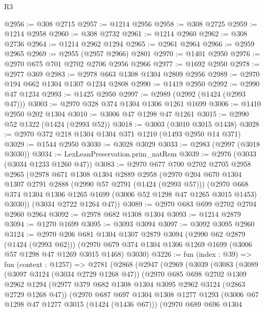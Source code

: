 \begin{lexlean}{R3}
\begin{coremodule}
@2956 := @308 @2715
@2957 := @1214 @2956
@2958 := @308 @2725
@2959 := @1214 @2958
@2960 := @308 @2732
@2961 := @1214 @2960
@2962 := @308 @2736
@2964 := @1214 @2962 @1294
@2965 := @2961 @2964
@2966 := @2959 @2965
@2969 := @2955 (@2957 @2966) @2801
@2970 := @1401 @2950
@2976 := @2970 @675 @701 @2702 @2706 @2956 @2966
@2977 := @1692 @2950
@2978 := @2977 @369
@2983 := @2978 @663 @1308 @1304 @2809 @2956
@2989 := @2970 @194 @662 @1304 @1307 @1234 @2808
@2990 := @1419 @2950
@2992 := @2990 @47 @1234
@2993 := @1425 @2950
@2997 := @2989 (@2992 (@1424 (@2993 @47)))
@3003 := @2970 @328 @374 @1304 @1306 @1261 @1699
@3006 := @1410 @2950 @202 @1304
@3010 := @3006 @47 @1298 @47 @1261
@3015 := @2990 @52 @1322 (@1424 (@2993 @52))
@3018 := @3003 (@3010 @3015 @1438)
@3028 := @2970 @372 @218 @1304 @1304 @371 @1210 (@1493 @2950 @14 @371)
@3029 := @1544 @2950
@3030 := @3028 @3029
@3033 := @2983 (@2997 (@3018 @3030))
@3034 := LexLeanPreservation.prim_natRem
@3039 := @2976 (@3033 (@3034 @1233 @1260 @47))
@3083 := @2970
    @677
    @700
    @2702
    @2705
    @2958
    @2965
    (@2978
      @671
      @1308
      @1304
      @2889
      @2958
      (@2970
        @204
        @670
        @1304
        @1307
        @2791
        @2888
        (@2990 @57 @2791 (@1424 (@2993 @57)))
        (@2970 @668 @374 @1304 @1306 @1265 @1699 (@3006 @52 @1298 @47 @1265 @3015 @1453) @3030))
      (@3034 @2722 @1264 @47))
@3089 := @2970 @683 @699 @2702 @2704 @2960 @2964
@3092 := @2978 @682 @1308 @1304
@3093 := @1214 @2879
@3094 := @1270 @1699
@3095 := @3093 @3094
@3097 := @3092 @3095 @2960
@3124 := @2970
    @206
    @681
    @1304
    @1307
    @2879
    @3094
    (@2990 @62 @2879 (@1424 (@2993 @62)))
    (@2970 @679 @374 @1304 @1306 @1269 @1699 (@3006 @57 @1298 @47 @1269 @3015 @1468) @3030)
@3226 := fun (index : @39) =>
  fun (context : @1257) =>
  @2781
    (@2868
      (@2947
        (@2969
          (@3039
            (@3083
              (@3089
                (@3097 @3124 (@3034 @2729 @1268 @47))
                (@2970
                  @685
                  @698
                  @2702
                  @1309
                  @2962
                  @1294
                  (@2977 @379 @682 @1308 @1304 @3095 @2962 @3124 (@2863 @2729 @1268 @47))
                  (@2970
                    @687
                    @697
                    @1304
                    @1308
                    @1277
                    @1293
                    (@3006 @67 @1298 @47 @1277 @3015 (@1424 (@1436 @67)))
                    (@2970
                      @689
                      @696
                      @1304

\end{coremodule}
\end{lexlean}
